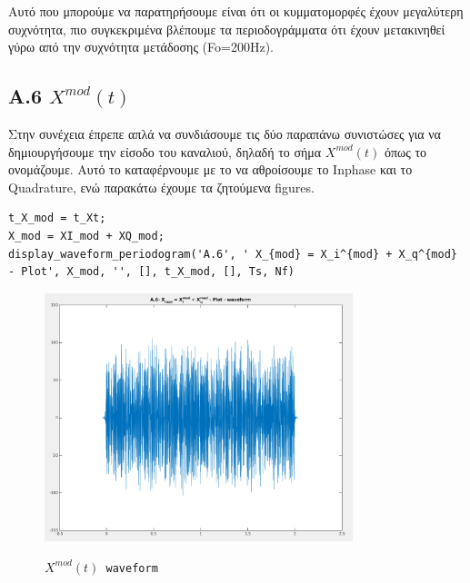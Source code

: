 \documentclass[11pt]{article}
\begin{document}
    \par \noindent
    Αυτό που μπορούμε να παρατηρήσουμε είναι ότι οι κυμματομορφές έχουν μεγαλύτερη συχνότητα, πιο συγκεκριμένα βλέπουμε τα περιοδογράμματα ότι έχουν μετακινηθεί γύρω από την συχνότητα μετάδοσης (Fo=200Hz).
    
    \subsection*{A.6  $X^{mod}(t)$}
    Στην συνέχεια έπρεπε απλά να συνδιάσουμε τις δύο παραπάνω συνιστώσες για να δημιουργήσουμε την είσοδο του καναλιού, δηλαδή το σήμα $X^{mod}(t)$ όπως το ονομάζουμε. 
    Αυτό το καταφέρνουμε με το να αθροίσουμε το Inphase και το Quadrature, ενώ παρακάτω έχουμε τα ζητούμενα figures. 
    
    
    \begin{lstlisting}[caption = {A.6 \texttt{Calculate $X^{mod}(t)$}}]
% A.6
t_X_mod = t_Xt;
X_mod = XI_mod + XQ_mod;
display_waveform_periodogram('A.6', ' X_{mod} = X_i^{mod} + X_q^{mod} - Plot', X_mod, '', [], t_X_mod, [], Ts, Nf)
    \end{lstlisting}
    
    \begin{figure}[H]
        \centering
        \includegraphics[scale=0.5, width=0.8\textwidth]{img/A6_mod_wave.png} \\
        \caption{\texttt{$X^{mod}(t)$ waveform}}
    \end{figure}
    
\end{document}
